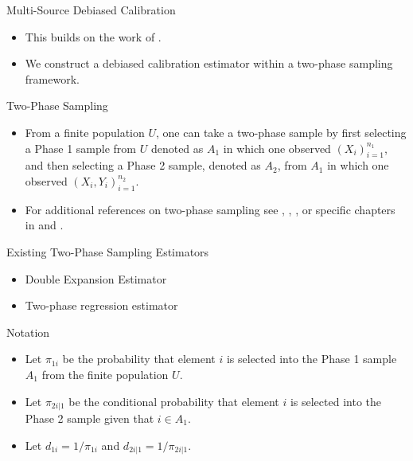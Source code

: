 \documentclass{beamer} %
\begin{document}
\begin{frame}{Multi-Source Debiased Calibration}

  \begin{itemize}
    \item This builds on the work of \cite{kwon2024debiased}.
    \item We construct a debiased calibration estimator within a two-phase
      sampling framework.
  \end{itemize}

\end{frame}

\begin{frame}{Two-Phase Sampling}

  \begin{itemize}
    \item From a finite population $U$, one can take a two-phase sample
    by first selecting a Phase 1 sample from $U$ denoted as $A_1$ in which one
    observed $(X_i)_{i = 1}^{n_1}$, and then selecting a Phase 2 sample,
    denoted as $A_2$, from $A_1$ in which one observed $(X_i, Y_i)_{i = 1}^{n_2}$.
  \item For additional references on two-phase sampling see 
    \cite{neyman1938contribution}, \cite{chen2007asymptotic},
    \cite{legg2009two}, \cite{hidiroglou1998use} or specific chapters in
    \cite{fuller2009sampling} and
    \cite{kim2024statistics}.
  \end{itemize}

\end{frame}

\begin{frame}{Existing Two-Phase Sampling Estimators}

  \begin{itemize}
    \item Double Expansion Estimator
    \item Two-phase regression estimator
  \end{itemize}

\end{frame}

\begin{frame}{Notation}
  \label{slide:tpnotation}

  \begin{itemize}
    \item Let $\pi_{1i}$ be the probability that element $i$ is selected into
      the Phase 1 sample $A_1$ from the finite population $U$.
    \item Let $\pi_{2i|1}$ be the conditional probability that element $i$ is
      selected into the Phase 2 sample given that $i \in A_1$.
    \item Let $d_{1i} = 1 / \pi_{1i}$ and $d_{2i|1} = 1 / \pi_{2i|1}$.
  \end{itemize}

\end{frame}
\end{document}
